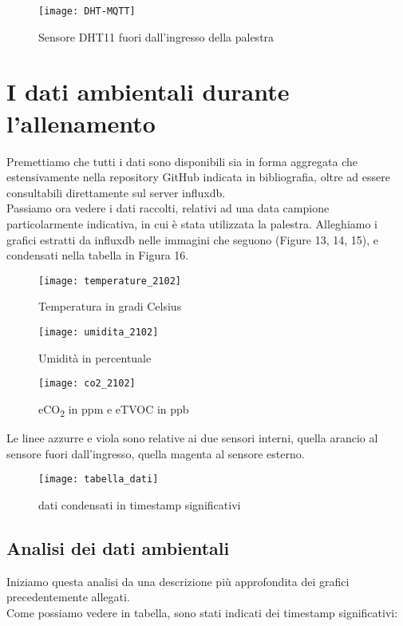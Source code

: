 \documentclass[fleqn,10pt]{SelfArx} %
\begin{document}
\begin{figure}[htb!]\centering
	\texttt{[image: DHT-MQTT]}
	\caption{Sensore DHT11 fuori dall'ingresso della palestra}
	\label{fig:DHT11 MQTT}
\end{figure}

\section{I dati ambientali durante l'allenamento}

Premettiamo che tutti i dati sono disponibili sia in forma aggregata che estensivamente nella repository GitHub indicata 
in bibliografia, oltre ad essere consultabili direttamente sul server influxdb.\\

Passiamo ora vedere i dati raccolti, relativi ad una data campione particolarmente indicativa, in cui è stata utilizzata 
la palestra. Alleghiamo i grafici estratti da influxdb nelle immagini che seguono (Figure 13, 14, 15), e 
condensati nella tabella in Figura 16.\\

\begin{figure}[htb]\centering
	\texttt{[image: temperature\_2102]}
	\caption{Temperatura in gradi Celsius}
	\label{fig:Variazione temperatura}
\end{figure}
\begin{figure}[htb]\centering
	\texttt{[image: umidita\_2102]}
	\caption{Umidità in percentuale}
	\label{fig:Variazione umidità}
\end{figure}
\begin{figure}[htb]\centering
	\texttt{[image: co2\_2102]}
	\caption{eCO\textsubscript{2} in ppm e eTVOC in ppb}
	\label{fig:Variazione CO2}
\end{figure}

Le linee azzurre e viola sono relative ai due sensori interni, quella arancio 
al sensore fuori dall'ingresso, quella magenta al sensore esterno.

\begin{figure}[htb]\centering
	\texttt{[image: tabella\_dati]}
	\captionsetup{width=\linewidth}
	\caption{dati condensati in timestamp significativi}
	\label{fig:tabella dati}
\end{figure}

\subsection{Analisi dei dati ambientali}
Iniziamo questa analisi da una descrizione più approfondita dei grafici precedentemente allegati.\\
Come possiamo vedere in tabella, sono stati indicati dei timestamp significativi: 
\end{document}
